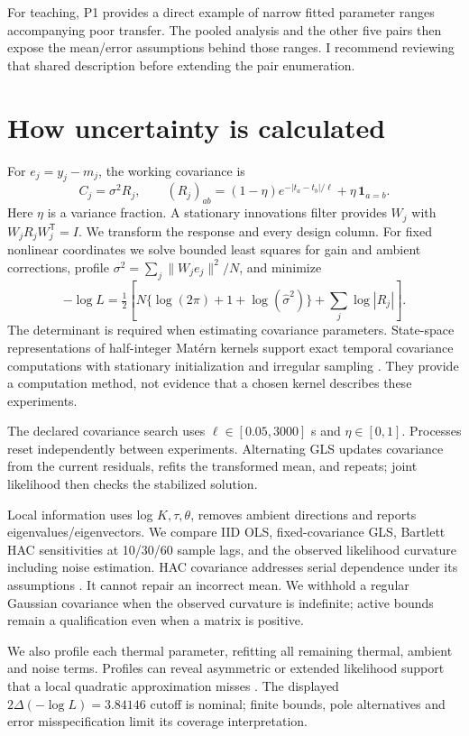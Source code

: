 \documentclass[10pt,letterpaper]{article}
\begin{document}
For teaching, P1 provides a direct example of narrow fitted parameter ranges accompanying poor transfer. The pooled analysis and the other five pairs then expose the mean/error assumptions behind those ranges. I recommend reviewing that shared description before extending the pair enumeration.
\FloatBarrier

\section{How uncertainty is calculated}
For $e_j=y_j-m_j$, the working covariance is
\[
C_j=\sigma^2 R_j,\qquad
(R_j)_{ab}=(1-\eta)e^{-|t_a-t_b|/\ell}+\eta\,\mathbf1_{a=b}.
\]
Here $\eta$ is a variance fraction. A stationary innovations filter provides $W_j$ with $W_jR_jW_j^\mathsf T=I$. We transform the response and every design column. For fixed nonlinear coordinates we solve bounded least squares for gain and ambient corrections, profile $\sigma^2=\sum_j\|W_je_j\|^2/N$, and minimize
\[
-\log L=\tfrac12\left[N\{\log(2\pi)+1+\log(\widehat\sigma^2)\}
+\sum_j\log|R_j|\right].
\]
The determinant is required when estimating covariance parameters. State-space representations of half-integer Mat\'ern kernels support exact temporal covariance computations with stationary initialization and irregular sampling \citep{hartikainen-2010-kalman}. They provide a computation method, not evidence that a chosen kernel describes these experiments.

The declared covariance search uses $\ell\in[0.05,3000]$ s and $\eta\in[0,1]$. Processes reset independently between experiments. Alternating GLS updates covariance from the current residuals, refits the transformed mean, and repeats; joint likelihood then checks the stabilized solution.

Local information uses log $K,\tau,\theta$, removes ambient directions and reports eigenvalues/eigenvectors. We compare IID OLS, fixed-covariance GLS, Bartlett HAC sensitivities at 10/30/60 sample lags, and the observed likelihood curvature including noise estimation. HAC covariance addresses serial dependence under its assumptions \citep{newey-1987-simple}. It cannot repair an incorrect mean. We withhold a regular Gaussian covariance when the observed curvature is indefinite; active bounds remain a qualification even when a matrix is positive.

We also profile each thermal parameter, refitting all remaining thermal, ambient and noise terms. Profiles can reveal asymmetric or extended likelihood support that a local quadratic approximation misses \citep{raue-2009-structural}. The displayed $2\Delta(-\log L)=3.84146$ cutoff is nominal; finite bounds, pole alternatives and error misspecification limit its coverage interpretation.
\end{document}
